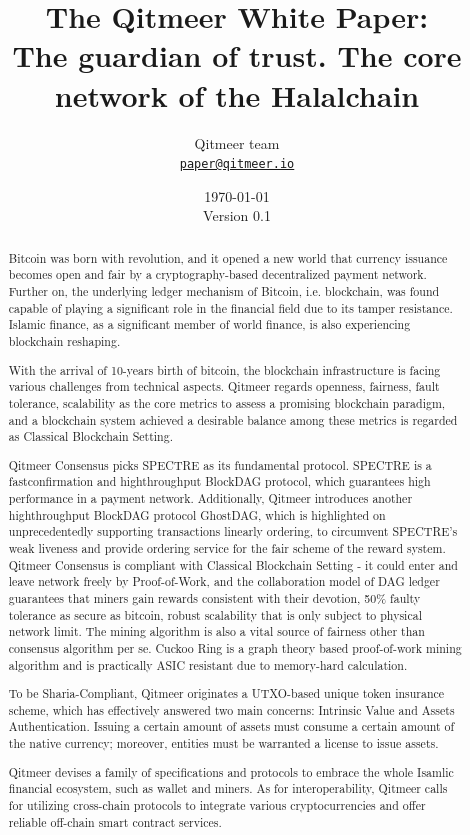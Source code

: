\documentclass[a4paper,11pt]{article}
\title{\LARGE The Qitmeer White Paper:\\
	\Large The guardian of trust. The core network of the Halalchain}
\author{
	Qitmeer team\\
		\small\href{mailto:paper@qitmeer.io}
			{\nolinkurl{paper@qitmeer.io}}
	}
\date{\today\\\small Version 0.1}
\newcommand{\watermark}[3]{\AddToShipoutPictureBG{
	\parbox[b][\paperheight]{\paperwidth}{
		\vfill%
		\centering%
	\tikz[remember picture, overlay]%
	  \node [rotate = #1, scale = #2] at (current page.center)%
	      {\textcolor{gray!80!cyan!30}{#3}};
	  \vfill}}}
\begin{document}
\clearpage
\pagestyle{plain}

\maketitle


\begin{abstract}
Bitcoin was born with revolution, and it opened a new world that currency issuance becomes open and fair by a cryptography-based decentralized payment network. Further on, the underlying ledger mechanism of Bitcoin, i.e. blockchain, was found capable of playing a significant role in the financial field due to its tamper resistance. Islamic finance, as a significant member of world finance, is also experiencing blockchain reshaping. 

With the arrival of 10-years birth of bitcoin, the blockchain infrastructure is facing various challenges from technical aspects. Qitmeer regards openness,     fairness, fault tolerance, scalability as the core metrics to assess a promising blockchain paradigm, and a blockchain system achieved a desirable balance among these metrics is regarded as Classical Blockchain Setting. 

Qitmeer Consensus picks SPECTRE as its fundamental protocol. SPECTRE is a fast\-confirmation and high\-throughput BlockDAG protocol, which guarantees high performance in a payment network. Additionally, Qitmeer introduces another high\-throughput BlockDAG protocol GhostDAG, which is highlighted on unprecedentedly supporting transactions linearly ordering, to circumvent SPECTRE's weak liveness and provide ordering service for the fair scheme of the reward system. Qitmeer Consensus is compliant with Classical Blockchain Setting - it could enter and leave network freely by Proof-of-Work, and the collaboration model of DAG ledger guarantees that miners gain rewards consistent with their devotion, 50\% faulty tolerance as secure as bitcoin, robust scalability that is only subject to physical network limit. The mining algorithm is also a vital source of fairness other than consensus algorithm per se. Cuckoo Ring is a graph theory based proof-of-work mining algorithm and is practically ASIC resistant due to memory-hard calculation.
    
To be Sharia-Compliant, Qitmeer originates a UTXO-based unique token insurance scheme, which has effectively answered two main concerns: Intrinsic Value and Assets Authentication. Issuing a certain amount of assets must consume a certain amount of the native currency; moreover, entities must be warranted a license to issue assets.
    
Qitmeer devises a family of specifications and protocols to embrace the whole Isamlic financial ecosystem, such as wallet and miners. As for interoperability, Qitmeer calls for utilizing cross-chain protocols to integrate various cryptocurrencies and offer reliable off-chain smart contract services.


\end{abstract}
\end{document}
